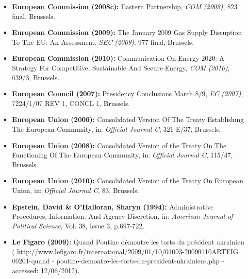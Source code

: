 \documentclass[11pt,a4paper,english]{scrreprt}
\begin{document}
\begin{itemize}
	\item [\Rectsteel] \textbf{European Commission (2008c):} Eastern
Partnership, \textsl{COM (2008)}, 823 final, Brussels.



	\item [\Rectsteel] \textbf{European Commission (2009):} The January
2009 Gas Supply Disruption To The EU: An Assessment, \textsl{SEC (2009)}, 977
final, Brussels.



	\item [\Rectsteel] \textbf{European Commission (2010):} Communication
On Energy 2020: A Strategy For Competitive, Sustainable And Secure Energy,
\textsl{COM (2010)}, 639/3, Brussels.



	\item [\Rectsteel] \textbf{European Council (2007):} Presidency
Conclusions March 8/9, \textsl{EC (2007)}, 7224/1/07 REV 1, CONCL 1, Brussels.



	\item [\Rectsteel] \textbf{European Union (2006):} Consolidated Version
Of The Treaty Establishing The European Community, in: \textsl{Official Journal
C}, 321 E/37, Brussels.



	\item [\Rectsteel] \textbf{European Union (2008):} Consolidated Version
of the Treaty On The Functioning Of The European Community, in: \textsl{Official
Journal C}, 115/47, Brussels.



	\item [\Rectsteel] \textbf{European Union (2010):} Consolidated Version
of the Treaty On European Union, in: \textsl{Official Journal C}, 83, Brussels.



	\item [\Rectsteel] \textbf{Epstein, David \& O'Halloran, Sharyn
(1994):} Administrative Procedures, Information, And Agency Discretion, in:
\textsl{American Journal of Political Science}, Vol. 38, Issue 3, p.697-722.



\item [\Rectsteel] \textbf{Le Figaro (2009):} Quand Poutine d\'{e}montre les
torts du pr\'{e}sident ukrainien
(\textcolor{dunkelgrau.80}{
http://www.lefigaro.fr/international/2009/01/10/01003-20090110ARTFIG\\
00201-quand - poutine-demontre-les-torts-du-president-ukrainien-.php} -
accessed: 12/06/2012).




\end{itemize}
\end{document}
